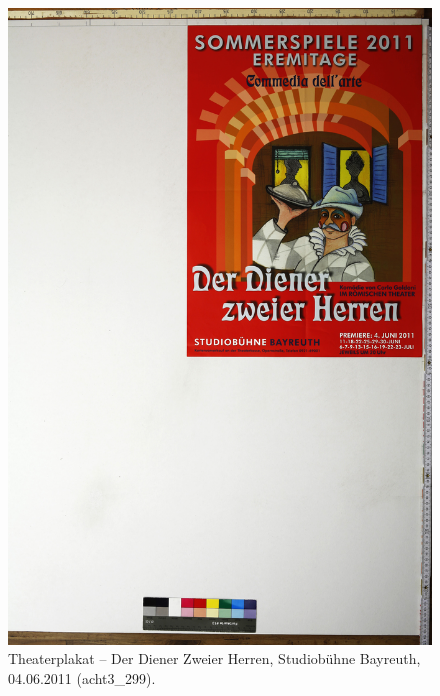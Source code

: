 \documentclass[a4paper,12pt,ngerman]{article}
\begin{document}
\newpage
\begin{figure}[ht]
\includegraphics[width=\linewidth]{Abbildung_10_(acht3_299)}
\centering
\caption{Theaterplakat -- Der Diener Zweier Herren, Studiobühne Bayreuth, 04.06.2011 (acht3\_299).}
\end{figure}
\end{document}
